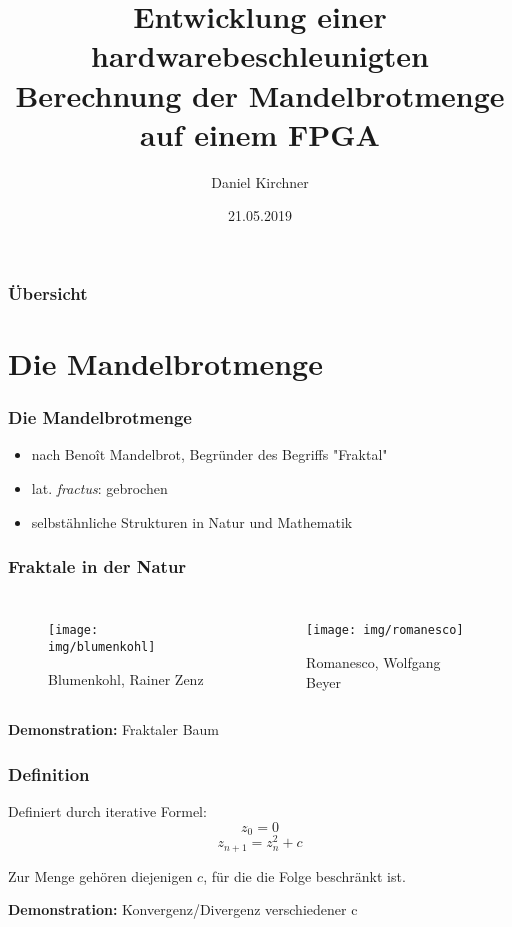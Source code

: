 \documentclass{beamer}
\title[D. Kirchner, Mandelbrotmenge in Hardware]{Entwicklung einer hardwarebeschleunigten Berechnung der Mandelbrotmenge auf einem FPGA} %
\author{Daniel Kirchner}
\institute[HS Coburg]
{
betreut durch: Prof. Oliver Engel\\
Hochschule Coburg
\medskip
}
\date{21.05.2019}
\begin{document}
\frame{\titlepage}

\begin{frame}
    \frametitle{Übersicht}
    \tableofcontents
\end{frame}

\section{Die Mandelbrotmenge}
\begin{frame}
    \frametitle{Die Mandelbrotmenge}
    \begin{itemize}
        \item {nach Benoît Mandelbrot, Begründer des Begriffs "Fraktal"}
        \item lat. \textit{fractus}: gebrochen
        \item selbstähnliche Strukturen in Natur und Mathematik
    \end{itemize}
\end{frame}

\begin{frame}
    \frametitle{Fraktale in der Natur}
    \begin{columns}[c]
            \begin{figure}
            \texttt{[image: img/blumenkohl]}
            \caption{Blumenkohl, Rainer Zenz} 
            \end{figure}
            \begin{figure}
            \texttt{[image: img/romanesco]}
            \caption{Romanesco, Wolfgang Beyer}
            \end{figure}
    \end{columns}
\end{frame}

\begin{frame}
    \centering \textbf{Demonstration:} Fraktaler Baum
\end{frame}

\begin{frame}
    \frametitle{Definition}
    Definiert durch iterative Formel:\\
    \[z_0 = 0\]
    \[z_{n+1} = z_n^2 + c\]
    
    Zur Menge gehören diejenigen $c$, für die die Folge beschränkt ist.
\end{frame}

\begin{frame}
    \centering \textbf{Demonstration:} Konvergenz/Divergenz verschiedener c
\end{frame}
\end{document}
